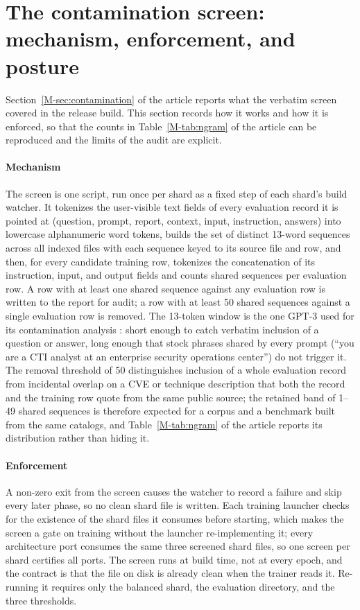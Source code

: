 \documentclass[11pt,a4paper]{article}
\begin{document}
\section{The contamination screen: mechanism, enforcement, and posture}\label{app:contamination}
Section~\ref{M-sec:contamination} of the article reports what the verbatim screen covered in the release build. This section records how it works and how it is enforced, so that the counts in Table~\ref{M-tab:ngram} of the article can be reproduced and the limits of the audit are explicit.

\paragraph{Mechanism}
The screen is one script, run once per shard as a fixed step of each shard's build watcher. It tokenizes the user-visible text fields of every evaluation record it is pointed at (question, prompt, report, context, input, instruction, answers) into lowercase alphanumeric word tokens, builds the set of distinct 13-word sequences across all indexed files with each sequence keyed to its source file and row, and then, for every candidate training row, tokenizes the concatenation of its instruction, input, and output fields and counts shared sequences per evaluation row. A row with at least one shared sequence against any evaluation row is written to the report for audit; a row with at least 50 shared sequences against a single evaluation row is removed. The 13-token window is the one GPT-3 used for its contamination analysis \citep{brown2020gpt3}: short enough to catch verbatim inclusion of a question or answer, long enough that stock phrases shared by every prompt (``you are a CTI analyst at an enterprise security operations center'') do not trigger it. The removal threshold of 50 distinguishes inclusion of a whole evaluation record from incidental overlap on a CVE or technique description that both the record and the training row quote from the same public source; the retained band of 1--49 shared sequences is therefore expected for a corpus and a benchmark built from the same catalogs, and Table~\ref{M-tab:ngram} of the article reports its distribution rather than hiding it.

\paragraph{Enforcement}
A non-zero exit from the screen causes the watcher to record a failure and skip every later phase, so no clean shard file is written. Each training launcher checks for the existence of the shard files it consumes before starting, which makes the screen a gate on training without the launcher re-implementing it; every architecture port consumes the same three screened shard files, so one screen per shard certifies all ports. The screen runs at build time, not at every epoch, and the contract is that the file on disk is already clean when the trainer reads it. Re-running it requires only the balanced shard, the evaluation directory, and the three thresholds.
\end{document}

